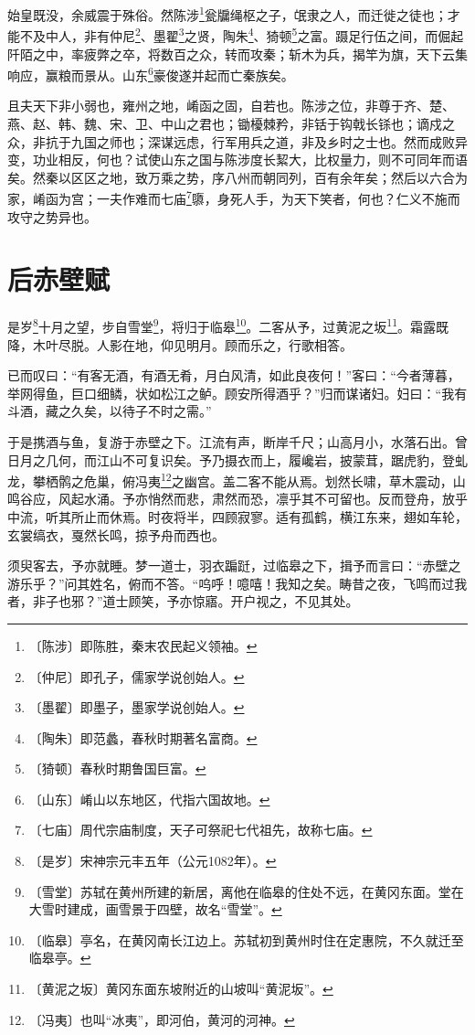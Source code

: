 \documentclass[12pt,UTF-8,openany]{ctexbook}
\begin{document}
\begin{normalsize}
    始皇既没，余威震于殊俗。然陈涉\footnote{〔陈涉〕即陈胜，秦末农民起义领袖。}瓮牖绳枢之子，氓隶之人，而迁徙之徒也；才能不及中人，非有仲尼\footnote{〔仲尼〕即孔子，儒家学说创始人。}、墨翟\footnote{〔墨翟〕即墨子，墨家学说创始人。}之贤，陶朱\footnote{〔陶朱〕即范蠡，春秋时期著名富商。}、猗顿\footnote{〔猗顿〕春秋时期鲁国巨富。}之富。蹑足行伍之间，而倔起阡陌之中，率疲弊之卒，将数百之众，转而攻秦；斩木为兵，揭竿为旗，天下云集响应，赢粮而景从。山东\footnote{〔山东〕崤山以东地区，代指六国故地。}豪俊遂并起而亡秦族矣。
    
    且夫天下非小弱也，雍州之地，崤函之固，自若也。陈涉之位，非尊于齐、楚、燕、赵、韩、魏、宋、卫、中山之君也；锄櫌棘矜，非铦于钩戟长铩也；谪戍之众，非抗于九国之师也；深谋远虑，行军用兵之道，非及乡时之士也。然而成败异变，功业相反，何也？试使山东之国与陈涉度长絜大，比权量力，则不可同年而语矣。然秦以区区之地，致万乘之势，序八州而朝同列，百有余年矣；然后以六合为家，崤函为宫；一夫作难而七庙\footnote{〔七庙〕周代宗庙制度，天子可祭祀七代祖先，故称七庙。}隳，身死人手，为天下笑者，何也？仁义不施而攻守之势异也。
\end{normalsize}



\chapter{后赤壁赋}

\begin{normalsize}
    
    是岁\footnote{〔是岁〕宋神宗元丰五年（公元1082年）。}十月之望，步自雪堂\footnote{〔雪堂〕苏轼在黄州所建的新居，离他在临皋的住处不远，在黄冈东面。堂在大雪时建成，画雪景于四壁，故名“雪堂”。}，将归于临皋\footnote{〔临皋〕亭名，在黄冈南长江边上。苏轼初到黄州时住在定惠院，不久就迁至临皋亭。}。二客从予，过黄泥之坂\footnote{〔黄泥之坂〕黄冈东面东坡附近的山坡叫“黄泥坂”。}。霜露既降，木叶尽脱。人影在地，仰见明月。顾而乐之，行歌相答。
    
    已而叹曰：“有客无酒，有酒无肴，月白风清，如此良夜何！”客曰：“今者薄暮，举网得鱼，巨口细鳞，状如松江之鲈。顾安所得酒乎？”归而谋诸妇。妇曰：“我有斗酒，藏之久矣，以待子不时之需。”
    
    于是携酒与鱼，复游于赤壁之下。江流有声，断岸千尺；山高月小，水落石出。曾日月之几何，而江山不可复识矣。予乃摄衣而上，履巉岩，披蒙茸，踞虎豹，登虬龙，攀栖鹘之危巢，俯冯夷\footnote{〔冯夷〕也叫“冰夷”，即河伯，黄河的河神。}之幽宫。盖二客不能从焉。划然长啸，草木震动，山鸣谷应，风起水涌。予亦悄然而悲，肃然而恐，凛乎其不可留也。反而登舟，放乎中流，听其所止而休焉。时夜将半，四顾寂寥。适有孤鹤，横江东来，翅如车轮，玄裳缟衣，戛然长鸣，掠予舟而西也。
    
    须臾客去，予亦就睡。梦一道士，羽衣蹁跹，过临皋之下，揖予而言曰：“赤壁之游乐乎？”问其姓名，俯而不答。“呜呼！噫嘻！我知之矣。畴昔之夜，飞鸣而过我者，非子也邪？”道士顾笑，予亦惊寤。开户视之，不见其处。
\end{normalsize}
\end{document}
